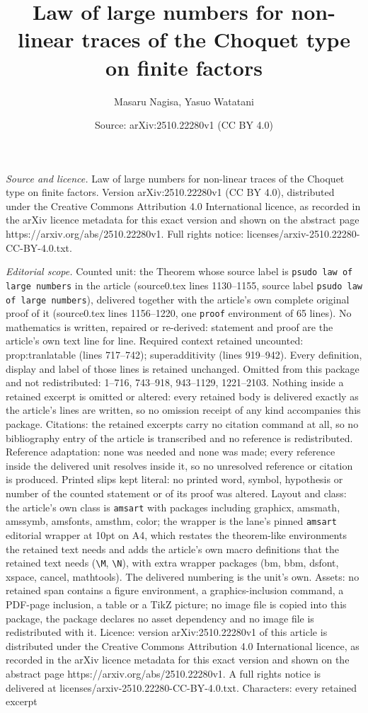 \documentclass[10pt,a4paper]{amsart}
\title[Law of large numbers for non-linear traces of the Choquet ty]{Law of large numbers for non-linear traces of the Choquet type on finite factors}
\author{Masaru Nagisa, Yasuo Watatani}
\date{Source: arXiv:2510.22280v1 (CC BY 4.0)}
\begin{document}
\maketitle

\noindent\emph{Source and licence.} Law of large numbers for non-linear traces of the Choquet type on finite factors. Version arXiv:2510.22280v1 (CC BY 4.0), distributed under the Creative Commons Attribution 4.0 International licence, as recorded in the arXiv licence metadata for this exact version and shown on the abstract page https://arxiv.org/abs/2510.22280v1. Full rights notice: licenses/arxiv-2510.22280-CC-BY-4.0.txt.\par\smallskip

\noindent\textit{Editorial scope.} Counted unit: the Theorem whose source label is \texttt{psudo law of large numbers} in the article (source0.tex lines 1130--1155, source label \texttt{psudo law of large numbers}), delivered together with the article's own complete original proof of it (source0.tex lines 1156--1220, one \texttt{proof} environment of 65 lines). No mathematics is written, repaired or re-derived: statement and proof are the article's own text line for line. Required context retained uncounted: prop:tranlatable (lines 717--742); superadditivity (lines 919--942). Every definition, display and label of those lines is retained unchanged. Omitted from this package and not redistributed: 1--716, 743--918, 943--1129, 1221--2103. Nothing inside a retained excerpt is omitted or altered: every retained body is delivered exactly as the article's lines are written, so no omission receipt of any kind accompanies this package. Citations: the retained excerpts carry no citation command at all, so no bibliography entry of the article is transcribed and no reference is redistributed. Reference adaptation: none was needed and none was made; every reference inside the delivered unit resolves inside it, so no unresolved reference or citation is produced. Printed slips kept literal: no printed word, symbol, hypothesis or number of the counted statement or of its proof was altered. Layout and class: the article's own class is \texttt{amsart} with packages including graphicx, amsmath, amssymb, amsfonts, amsthm, color; the wrapper is the lane's pinned \texttt{amsart} editorial wrapper at 10pt on A4, which restates the theorem-like environments the retained text needs and adds the article's own macro definitions that the retained text needs (\texttt{\textbackslash M}, \texttt{\textbackslash N}), with extra wrapper packages (bm, bbm, dsfont, xspace, cancel, mathtools). The delivered numbering is the unit's own. Assets: no retained span contains a figure environment, a graphics-inclusion command, a PDF-page inclusion, a table or a TikZ picture; no image file is copied into this package, the package declares no asset dependency and no image file is redistributed with it. Licence: version arXiv:2510.22280v1 of this article is distributed under the Creative Commons Attribution 4.0 International licence, as recorded in the arXiv licence metadata for this exact version and shown on the abstract page https://arxiv.org/abs/2510.22280v1. A full rights notice is delivered at licenses/arxiv-2510.22280-CC-BY-4.0.txt. Characters: every retained excerpt 
\end{document}
